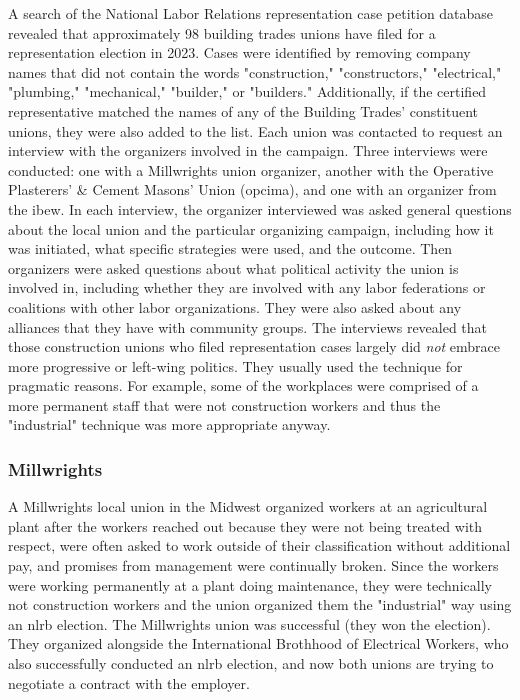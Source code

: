 \documentclass[12pt]{article}
\begin{document}
A search of the National Labor Relations representation case petition database revealed that approximately 98 building trades unions have filed for a representation election in 2023. Cases were identified by removing company names that did not contain the words "construction," "constructors," "electrical," "plumbing," "mechanical," "builder," or "builders." Additionally, if the certified representative matched the names of any of the Building Trades’ constituent unions, they were also added to the list. Each union was contacted to request an interview with the organizers involved in the campaign. Three interviews were conducted: one with a Millwrights union organizer, another with the Operative Plasterers' \& Cement Masons' Union (\acrshort{opcima}), and one with an organizer from the \acrfull{ibew}. In each interview, the organizer interviewed was asked general questions about the local union and the particular organizing campaign, including how it was initiated, what specific strategies were used, and the outcome. Then organizers were asked questions about what political activity the union is involved in, including whether they are involved with any labor federations or coalitions with other labor organizations. They were also asked about any alliances that they have with community groups. The interviews revealed that those construction unions who filed representation cases largely did \emph{not} embrace more progressive or left-wing politics. They usually used the technique for pragmatic reasons. For example, some of the workplaces were comprised of a more permanent staff that were not construction workers and thus the "industrial" technique was more appropriate anyway.

\subsubsection{Millwrights}

A Millwrights local union in the Midwest organized workers at an agricultural plant after the workers reached out because they were not being treated with respect, were often asked to work outside of their classification without additional pay, and promises from management were continually broken. Since the workers were working permanently at a plant doing maintenance, they were technically not construction workers and the union organized them the "industrial" way using an \acrshort{nlrb} election. The Millwrights union was successful (they won the election). They organized alongside the International Brothhood of Electrical Workers, who also successfully conducted an \acrshort{nlrb} election, and now both unions are trying to negotiate a contract with the employer.
\end{document}
